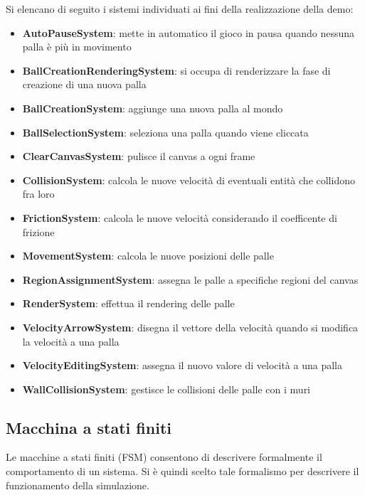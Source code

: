 Si elencano di seguito i sistemi individuati ai fini della realizzazione della demo:
\begin{itemize}
    \item \textbf{AutoPauseSystem}: mette in automatico il gioco in pausa quando nessuna palla è più in movimento
    \item \textbf{BallCreationRenderingSystem}: si occupa di renderizzare la fase di creazione di una nuova palla
    \item \textbf{BallCreationSystem}: aggiunge una nuova palla al mondo
    \item \textbf{BallSelectionSystem}: seleziona una palla quando viene cliccata
    \item \textbf{ClearCanvasSystem}: pulisce il canvas a ogni frame
    \item \textbf{CollisionSystem}: calcola le nuove velocità di eventuali entità che collidono fra loro
    \item \textbf{FrictionSystem}: calcola le nuove velocità considerando il coefficente di frizione
    \item \textbf{MovementSystem}: calcola le nuove posizioni delle palle
    \item \textbf{RegionAssignmentSystem}: assegna le palle a specifiche regioni del canvas
    \item \textbf{RenderSystem}: effettua il rendering delle palle
    \item \textbf{VelocityArrowSystem}: disegna il vettore della velocità quando si modifica la velocità a una palla
    \item \textbf{VelocityEditingSystem}: assegna il nuovo valore di velocità a una palla
    \item \textbf{WallCollisionSystem}: gestisce le collisioni delle palle con i muri
\end{itemize}

\subsection{Macchina a stati finiti}\label{subsec:macchina-a-stati-finiti}
Le macchine a stati finiti (FSM) consentono di descrivere formalmente il comportamento di un sistema.
Si è quindi scelto tale formalismo per descrivere il funzionamento della simulazione.

